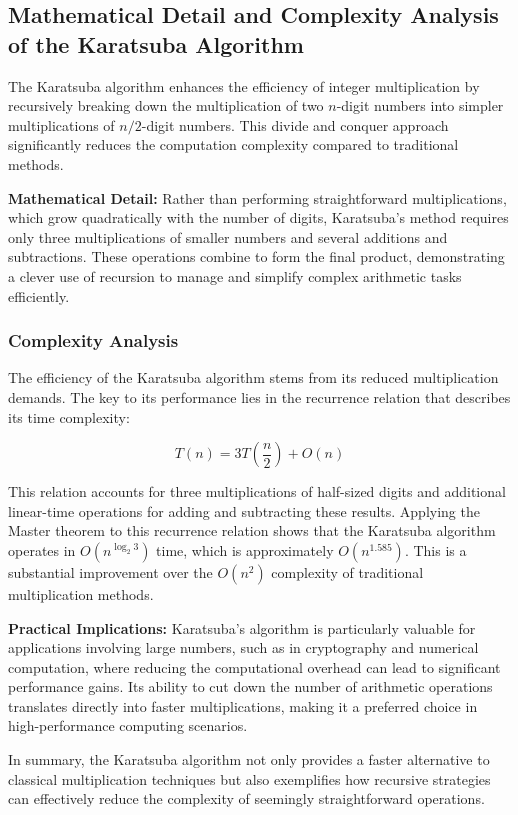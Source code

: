 \documentclass[12pt]{book} %
\begin{document}
\subsection{Mathematical Detail and Complexity Analysis of the Karatsuba Algorithm}

The Karatsuba algorithm enhances the efficiency of integer multiplication by recursively breaking down the multiplication of two \(n\)-digit numbers into simpler multiplications of \(n/2\)-digit numbers. This divide and conquer approach significantly reduces the computation complexity compared to traditional methods.

\textbf{Mathematical Detail:}
Rather than performing straightforward multiplications, which grow quadratically with the number of digits, Karatsuba's method requires only three multiplications of smaller numbers and several additions and subtractions. These operations combine to form the final product, demonstrating a clever use of recursion to manage and simplify complex arithmetic tasks efficiently.

\subsubsection{Complexity Analysis}
The efficiency of the Karatsuba algorithm stems from its reduced multiplication demands. The key to its performance lies in the recurrence relation that describes its time complexity:

\[
T(n) = 3T\left(\frac{n}{2}\right) + O(n)
\]

This relation accounts for three multiplications of half-sized digits and additional linear-time operations for adding and subtracting these results. Applying the Master theorem to this recurrence relation shows that the Karatsuba algorithm operates in \(O(n^{\log_2 3})\) time, which is approximately \(O(n^{1.585})\). This is a substantial improvement over the \(O(n^2)\) complexity of traditional multiplication methods.

\textbf{Practical Implications:}
Karatsuba's algorithm is particularly valuable for applications involving large numbers, such as in cryptography and numerical computation, where reducing the computational overhead can lead to significant performance gains. Its ability to cut down the number of arithmetic operations translates directly into faster multiplications, making it a preferred choice in high-performance computing scenarios.

In summary, the Karatsuba algorithm not only provides a faster alternative to classical multiplication techniques but also exemplifies how recursive strategies can effectively reduce the complexity of seemingly straightforward operations.
\end{document}
